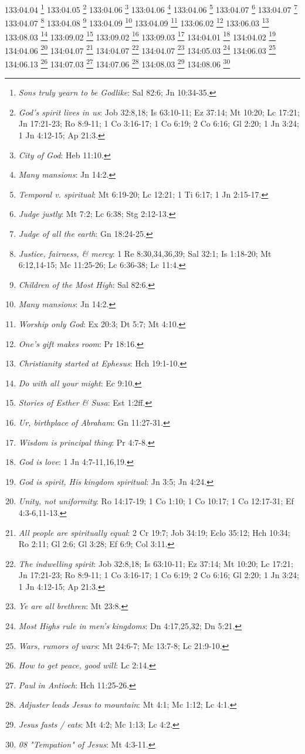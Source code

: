 {{{{{{{{{{{133:04.04 \footnote{\textit{Sons truly yearn to be Godlike}: Sal 82:6; Jn 10:34-35.}
133:04.05 \footnote{\textit{God's spirit lives in us}: Job 32:8,18; Is 63:10-11; Ez 37:14; Mt 10:20; Lc 17:21; Jn 17:21-23; Ro 8:9-11; 1 Co 3:16-17; 1 Co 6:19; 2 Co 6:16; Gl 2:20; 1 Jn 3:24; 1 Jn 4:12-15; Ap 21:3.}
133:04.06 \footnote{\textit{City of God}: Heb 11:10.}
133:04.06 \footnote{\textit{Many mansions}: Jn 14:2.}
133:04.06 \footnote{\textit{Temporal v. spiritual}: Mt 6:19-20; Lc 12:21; 1 Ti 6:17; 1 Jn 2:15-17.}
133:04.07 \footnote{\textit{Judge justly}: Mt 7:2; Lc 6:38; Stg 2:12-13.}
133:04.07 \footnote{\textit{Judge of all the earth}: Gn 18:24-25.}
133:04.07 \footnote{\textit{Justice, fairness, & mercy}: 1 Re 8:30,34,36,39; Sal 32:1; Is 1:18-20; Mt 6:12,14-15; Mc 11:25-26; Lc 6:36-38; Lc 11:4.}
133:04.08 \footnote{\textit{Children of the Most High}: Sal 82:6.}
133:04.09 \footnote{\textit{Many mansions}: Jn 14:2.}
133:04.09 \footnote{\textit{Worship only God}: Ex 20:3; Dt 5:7; Mt 4:10.}
133:06.02 \footnote{\textit{One's gift makes room}: Pr 18:16.}
133:06.03 \footnote{\textit{Christianity started at Ephesus}: Hch 19:1-10.}
133:08.03 \footnote{\textit{Do with all your might}: Ec 9:10.}
133:09.02 \footnote{\textit{Stories of Esther & Susa}: Est 1:2ff.}
133:09.02 \footnote{\textit{Ur, birthplace of Abraham}: Gn 11:27-31.}
133:09.03 \footnote{\textit{Wisdom is principal thing}: Pr 4:7-8.}
134:04.01 \footnote{\textit{God is love}: 1 Jn 4:7-11,16,19.}
134:04.02 \footnote{\textit{God is spirit, His kingdom spiritual}: Jn 3:5; Jn 4:24.}
134:04.06 \footnote{\textit{Unity, not uniformity}: Ro 14:17-19; 1 Co 1:10; 1 Co 10:17; 1 Co 12:17-31; Ef 4:3-6,11-13.}
134:04.07 \footnote{\textit{All people are spiritually equal}: 2 Cr 19:7; Job 34:19; Eclo 35:12; Hch 10:34; Ro 2:11; Gl 2:6; Gl 3:28; Ef 6:9; Col 3:11.}
134:04.07 \footnote{\textit{The indwelling spirit}: Job 32:8,18; Is 63:10-11; Ez 37:14; Mt 10:20; Lc 17:21; Jn 17:21-23; Ro 8:9-11; 1 Co 3:16-17; 1 Co 6:19; 2 Co 6:16; Gl 2:20; 1 Jn 3:24; 1 Jn 4:12-15; Ap 21:3.}
134:04.07 \footnote{\textit{Ye are all brethren}: Mt 23:8.}
134:05.03 \footnote{\textit{Most Highs rule in men's kingdoms}: Dn 4:17,25,32; Dn 5:21.}
134:06.03 \footnote{\textit{Wars, rumors of wars}: Mt 24:6-7; Mc 13:7-8; Lc 21:9-10.}
134:06.13 \footnote{\textit{How to get peace, good will}: Lc 2:14.}
134:07.03 \footnote{\textit{Paul in Antioch}: Hch 11:25-26.}
134:07.06 \footnote{\textit{Adjuster leads Jesus to mountain}: Mt 4:1; Mc 1:12; Lc 4:1.}
134:08.03 \footnote{\textit{Jesus fasts / eats}: Mt 4:2; Mc 1:13; Lc 4:2.}
134:08.06 \footnote{\textit{08 "Tempation" of Jesus}: Mt 4:3-11.}
}}}}}}}}}}}
